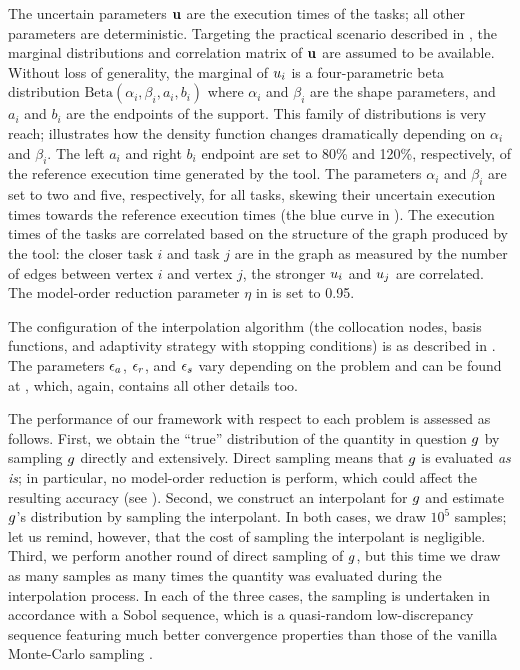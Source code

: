 
The uncertain parameters $\mathbf{u}$ are the execution times of the tasks; all other
parameters are deterministic. Targeting the practical scenario described in
, the marginal distributions and correlation matrix of $\mathbf{u}$
are assumed to be available. Without loss of generality, the marginal of $u_i$
is a four-parametric beta distribution $\text{Beta}(\alpha_i, \beta_i, a_i,
b_i)$ where $\alpha_i$ and $\beta_i$ are the shape parameters, and $a_i$ and
$b_i$ are the endpoints of the support. This family of distributions is very
reach;  illustrates how the density function changes
dramatically depending on $\alpha_i$ and $\beta_i$. The left $a_i$ and right
$b_i$ endpoint are set to 80\% and 120\%, respectively, of the reference
execution time generated by the  tool. The parameters $\alpha_i$ and
$\beta_i$ are set to two and five, respectively, for all tasks, skewing their
uncertain execution times towards the reference execution times (the blue curve
in ). The execution times of the tasks are correlated based
on the structure of the graph produced by the  tool: the closer task
$i$ and task $j$ are in the graph as measured by the number of edges between
vertex $i$ and vertex $j$, the stronger $u_i$ and $u_j$ are correlated. The
model-order reduction parameter $\eta$ in  is set to 0.95.

The configuration of the interpolation algorithm (the collocation nodes, basis
functions, and adaptivity strategy with stopping conditions) is as described in
. The parameters $\epsilon_a$, $\epsilon_r$, and $\epsilon_s$ vary
depending on the problem and can be found at \cite{sources}, which, again,
contains all other details too.

The performance of our framework with respect to each problem is assessed as
follows. First, we obtain the ``true'' distribution of the quantity in question
$g$ by sampling $g$ directly and extensively. Direct sampling means that $g$
is evaluated \emph{as is}; in particular, no model-order reduction is perform,
which could affect the resulting accuracy (see ). Second, we
construct an interpolant for $g$ and estimate $g$'s distribution by sampling
the interpolant. In both cases, we draw $10^5$ samples; let us remind, however,
that the cost of sampling the interpolant is negligible. Third, we perform
another round of direct sampling of $g$, but this time we draw as many samples
as many times the quantity was evaluated during the interpolation process. In
each of the three cases, the sampling is undertaken in accordance with a Sobol
sequence, which is a quasi-random low-discrepancy sequence featuring much better
convergence properties than those of the vanilla Monte-Carlo sampling
\cite{joe2008}.


